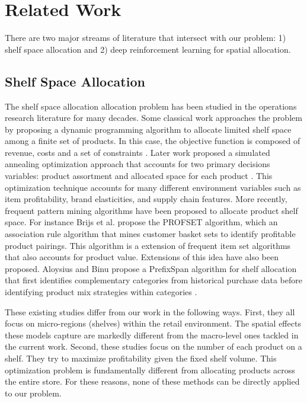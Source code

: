 \section{Related Work}

There are two major streams of literature that intersect with our problem: 1) shelf space allocation and 2) deep reinforcement learning for spatial allocation.

\subsection{Shelf Space Allocation} 
The shelf space allocation allocation problem has been studied in the operations research literature for many decades. Some classical work approaches the problem by proposing a dynamic programming algorithm to allocate limited shelf space among a finite set of products. In this case, the objective function is composed of revenue, costs and a set of constraints \cite{zufryden}. Later work proposed a simulated annealing optimization approach that accounts for two primary decisions variables: product assortment and allocated space for each product \cite{borin}. This optimization technique accounts for many different environment variables such as item profitability, brand elasticities, and supply chain features. More recently, frequent pattern mining algorithms have been proposed to allocate product shelf space. For instance Brijs et al. \cite{brijs} propose the PROFSET algorithm, which an association rule algorithm that mines customer basket sets to identify profitable product pairings. This algorithm is a extension of frequent item set algorithms that also accounts for product value. Extensions of this idea have also been proposed. Aloysius and Binu propose a PrefixSpan algorithm for shelf allocation  that first identifies complementary categories from historical purchase data before identifying product mix strategies within categories \cite{aloysius}.

These existing studies differ from our work in the following ways. First, they all focus on micro-regions (shelves) within the retail environment. The spatial effects these models capture are markedly different from the macro-level ones tackled in the current work. Second, these studies focus on the number of each product on a shelf. They try to maximize profitability given the fixed shelf volume. This optimization problem is fundamentally different from allocating products across the entire store. For these reasons, none of these methods can be directly applied to our problem.

